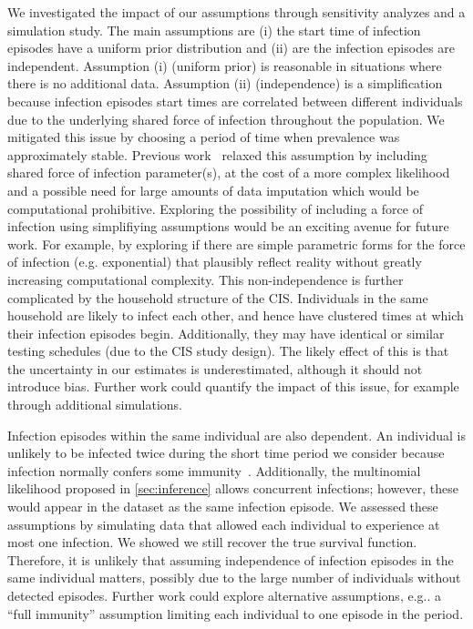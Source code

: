 \documentclass[referee,useAMS,usenatbib]{biom}
\makeatletter
\DeclareRobustCommand\onedot{\futurelet\@let@token\@onedot}
\def\@onedot{\ifx\@let@token.\else.\null\fi\xspace}
\def\eg{e.g\onedot} \def\Eg{{E.g}\onedot}
\makeatother
\begin{document}
We investigated the impact of our assumptions through sensitivity analyzes and a simulation study.
The main assumptions are (i) the start time of infection episodes have a uniform prior distribution and (ii) are the infection episodes are independent.
Assumption (i) (uniform prior) is reasonable in situations where there is no additional data. 
Assumption (ii) (independence) is a simplification because infection episodes start times are correlated between different individuals due to the underlying shared force of infection throughout the population.
We mitigated this issue by choosing a period of time when prevalence was approximately stable.
Previous work~\citep[e.g.][]{haySerosolver} relaxed this assumption by including shared force of infection parameter(s), at the cost of a more complex likelihood and a possible need for large amounts of data imputation which would be computational prohibitive.
Exploring the possibility of including a force of infection using simplifiying assumptions would be an exciting avenue for future work.
For example, by exploring if there are simple parametric forms for the force of infection (e.g. exponential) that plausibly reflect reality without greatly increasing computational complexity.
This non-independence is further complicated by the household structure of the CIS.
Individuals in the same household are likely to infect each other, and hence have clustered times at which their infection episodes begin.
Additionally, they may have identical or similar testing schedules (due to the CIS study design).
The likely effect of this is that the uncertainty in our estimates is underestimated, although it should not introduce bias.
Further work could quantify the impact of this issue, for example through additional simulations.

Infection episodes within the same individual are also dependent.
An individual is unlikely to be infected twice during the short time period we consider because infection normally confers some immunity~\citep{milneImmunity}.
Additionally, the multinomial likelihood proposed in \cref{sec:inference} allows concurrent infections; however, these would appear in the dataset as the same infection episode.
We assessed these assumptions by simulating data that allowed each individual to experience at most one infection.
We showed we still recover the true survival function.
Therefore, it is unlikely that assuming independence of infection episodes in the same individual matters, possibly due to the large number of individuals without detected episodes.
Further work could explore alternative assumptions, \eg a ``full immunity'' assumption limiting each individual to one episode in the period.
\end{document}
